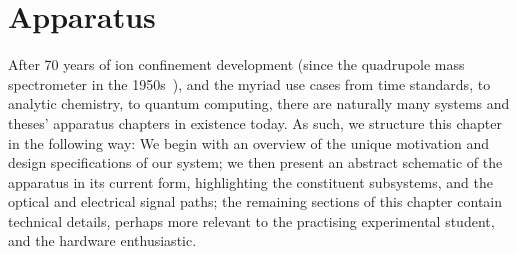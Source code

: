 \chapter{Apparatus}
\label{ch:apparatus}


\minitoc

    After 70 years of ion confinement development (since the quadrupole mass
    spectrometer in the 1950s~\cite{paul_electromagnetic_1990}), and the myriad
    use cases from time standards, to analytic chemistry, to quantum computing,
    there are naturally many systems and theses' apparatus chapters in existence
    today. As such, we structure this chapter in the following way: 
    We begin with an overview of the unique motivation and design specifications of our system; 
    we then present an abstract schematic of the apparatus in
    its current form, highlighting the constituent subsystems, and the optical
    and electrical signal paths; 
    the remaining sections of this chapter contain
    technical details, perhaps more relevant to the practising experimental
    student, and the hardware enthusiastic.


